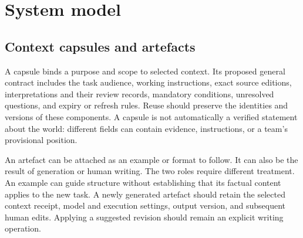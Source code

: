\documentclass[
  11pt,
]{article}
\let\originalsection\section
\renewcommand{\section}{\Needspace{5\baselineskip}\originalsection}
\begin{document}
\section{System model}\label{system-model}

\subsection{Context capsules and
artefacts}\label{context-capsules-and-artefacts}

A capsule binds a purpose and scope to selected context. Its proposed
general contract includes the task audience, working instructions, exact
source editions, interpretations and their review records, mandatory
conditions, unresolved questions, and expiry or refresh rules. Reuse
should preserve the identities and versions of these components. A
capsule is not automatically a verified statement about the world:
different fields can contain evidence, instructions, or a team's
provisional position.

An artefact can be attached as an example or format to follow. It can
also be the result of generation or human writing. The two roles require
different treatment. An example can guide structure without establishing
that its factual content applies to the new task. A newly generated
artefact should retain the selected context receipt, model and execution
settings, output version, and subsequent human edits. Applying a
suggested revision should remain an explicit writing operation.
\end{document}
